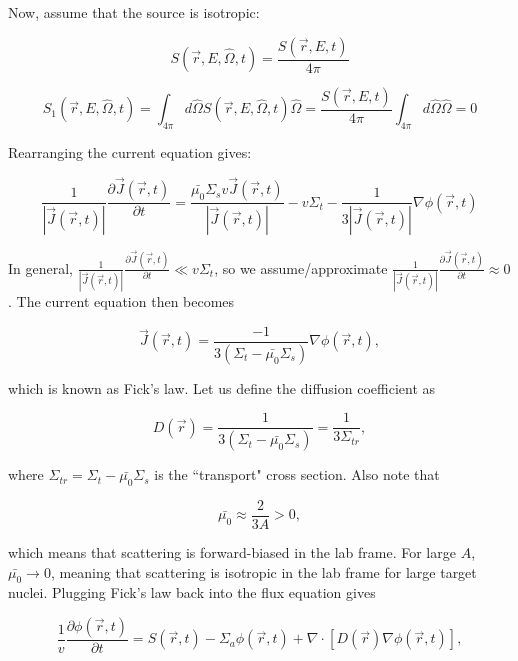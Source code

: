 \documentclass[12pt]{article}
\newcommand{\rvec}{\ensuremath{\vec{r}}}
\newcommand{\omvec}{\ensuremath{\hat{\Omega}}}
\begin{document}
Now, assume that the source is isotropic:

\begin{equation*}
S(\rvec,E,\omvec,t) = \frac{S(\rvec,E,t)}{4\pi}
\end{equation*}

\begin{equation*}
S_1(\rvec,E,\omvec,t) = \int_{4\pi}d\omvec S(\rvec,E,\omvec,t)\omvec 
= \frac{S(\rvec,E,t)}{4\pi} \int_{4\pi}d\omvec\omvec = 0
\end{equation*}

Rearranging the current equation gives:

\begin{equation*}
\frac{1}{|\vec{J}(\rvec,t)|}\frac{\partial\vec{J}(\rvec,t)}{\partial t} 
= \frac{\bar{\mu_0}\Sigma_sv\vec{J}(\rvec,t)}{|\vec{J}(\rvec,t)|} - v\Sigma_t 
- \frac{1}{3|\vec{J}(\rvec,t)|}\nabla\phi(\rvec,t)
\end{equation*}

In general, $\frac{1}{|\vec{J}(\rvec,t)|}\frac{\partial\vec{J}(\rvec,t)}{\partial t} \ll v\Sigma_t$, so we
assume/approximate $\frac{1}{|\vec{J}(\rvec,t)|}\frac{\partial\vec{J}(\rvec,t)}{\partial t} \approx 0$.
The current equation then becomes

\begin{equation*}
\vec{J}(\rvec,t) = \frac{-1}{3(\Sigma_t - \bar{\mu_0}\Sigma_s)}\nabla\phi(\rvec,t),
\end{equation*}

which is known as Fick's law. Let us define the diffusion coefficient as

\begin{equation*}
D(\rvec) = \frac{1}{3(\Sigma_t - \bar{\mu_0}\Sigma_s)} = \frac{1}{3\Sigma_{tr}},
\end{equation*}

where $\Sigma_{tr} = \Sigma_t - \bar{\mu_0}\Sigma_s$ is the ``transport" cross section. Also note that

\begin{equation*}
\bar{\mu_0} \approx \frac{2}{3A} > 0,
\end{equation*}

which means that scattering is forward-biased in the lab frame. For large $A$, $\bar{\mu_0}\rightarrow0$,
meaning that scattering is isotropic in the lab frame for large target nuclei. Plugging Fick's law back 
into the flux equation gives

\begin{equation*}
\frac{1}{v}\frac{\partial\phi(\rvec,t)}{\partial t} = S(\rvec,t) - \Sigma_a\phi(\rvec,t) + 
\nabla\cdot[D(\rvec)\nabla\phi(\rvec,t)],
\end{equation*}
\end{document}
